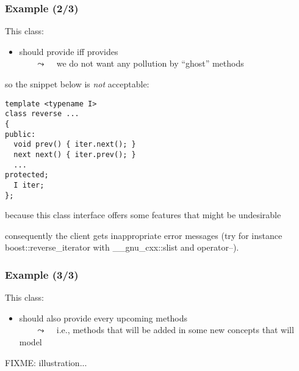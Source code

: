 \begin{frame}[fragile]
  \frametitle{Example (2/3)}

This class:
\smallskip
%

\begin{itemize}
\item should provide \bfnext iff \bfI provides \bfprev\\
  ~~~ {\scriptsize $\leadsto$ ~ we do not want any pollution by ``ghost'' methods }
\end{itemize}

%
\bigskip
%

so the snippet below is \textit{not} acceptable:

\smallskip

\begin{multicols}{2}
%
\begin{lstlisting}[basicstyle={\tiny\sffamily}]
template <typename I>
class reverse ...
{
public:
  void prev() { iter.next(); }
  next next() { iter.prev(); }
  ...
protected;
  I iter;
};
\end{lstlisting}
%
\columnbreak
%
because this class interface offers some features that might be
undesirable
%
\end{multicols}

%
\bigskip
%

{\tiny
  consequently the client gets inappropriate error messages (try for instance
  boost::reverse\_iterator with \_\_gnu\_cxx::slist and operator--). 
}

\end{frame}




\begin{frame}
  \frametitle{Example (3/3)}


This class:
\smallskip
%

\begin{itemize}
\item should also provide every upcoming methods\\
  ~~~ {\scriptsize $\leadsto$ ~ i.e., methods that will be added in
    some new concepts that \bfI will model }
\end{itemize}

%
\bigskip
%

FIXME: illustration...

\end{frame}



